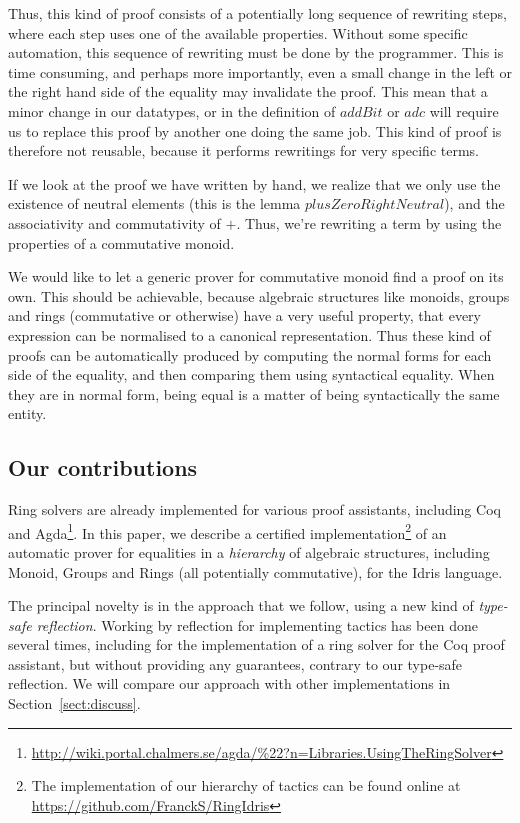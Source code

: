 Thus, this kind of proof consists of a potentially long sequence of rewriting
steps,
where each step uses one of the available properties. Without some
specific automation, this sequence of rewriting must be done by the programmer.
This is time consuming, and perhaps more importantly, even a small
change in the left
or the right hand side of the equality may invalidate the proof.
This mean that a minor change in our
datatypes, or in the definition of $addBit$ or $adc$ will require us to
replace this proof by another one doing the same job.
This kind
of proof is therefore not reusable, because it performs rewritings for
very specific terms.

If we look at the proof we have written by hand, we realize that we only use
the existence of neutral elements (this is the lemma $plusZeroRightNeutral$),
and the associativity and commutativity of $+$. Thus, we're rewriting a term by
using the properties of a commutative monoid.

We would like to let a generic prover for commutative monoid find a proof on its own.
This should be achievable, because algebraic structures like monoids, groups and
rings (commutative or otherwise) have a very useful property, that
every expression can be normalised to a canonical representation. Thus
these kind of proofs can be automatically produced by computing the
normal forms for each side of the equality, and then comparing them using
syntactical equality. When they are in normal
form, being equal is a matter of being syntactically the same entity.

\subsection{Our contributions}

Ring solvers are already implemented for various proof
assistants, including Coq~\cite{Coq2005} and Agda\footnote{\url{http://wiki.portal.chalmers.se/agda/\%22?n=Libraries.UsingTheRingSolver}}. 
In this paper, we describe a certified
implementation\footnote{The implementation of our hierarchy of tactics can be found online at \url{https://github.com/FranckS/RingIdris}} of an automatic prover for equalities in a
\emph{hierarchy} of algebraic
structures, including Monoid, Groups and Rings (all potentially commutative),
for the Idris language. 

The principal novelty is in the approach that we follow, using a
new kind of \emph{type-safe reflection}.  Working by reflection for implementing
tactics has been done several times, including for the implementation of a
ring solver for the Coq proof assistant, but without
providing any guarantees, contrary to our type-safe reflection. We will
compare our approach with other implementations in Section~\ref{sect:discuss}.


